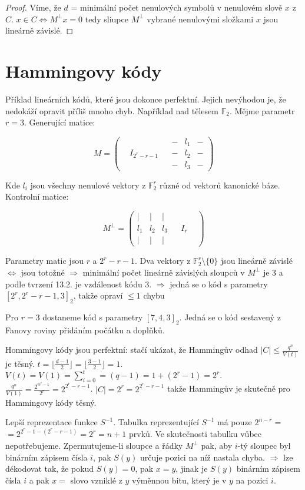 \begin{proof}
	Víme, že $d$ = minimální počet nenulových symbolů v nenulovém slově $x$ z $C$. $x \in C \Leftrightarrow M^{\bot}x = 0$ tedy sliupce $M^{\bot}$ vybrané nenulovými složkami $x$ jsou lineárně závislé.
\end{proof}

\section{Hammingovy kódy}

Příklad lineárních kódů, které jsou dokonce perfektní. Jejich nevýhodou je, že nedokáží opravit příliš mnoho chyb. Například nad tělesem $\mathbb{F}_{2}$. Mějme parametr $r = 3$. Generující matice:

$$
M =
\begin{pmatrix}
	&  &  & - & l_{1} & - \\
	& I_{2^{r}-r-1} &  & - & l_{2} & - \\
	&  &  & - & l_{3} & -
\end{pmatrix}
$$

Kde $l_{i}$ jsou všechny nenulové vektory z $\mathbb{F}_{2}^{r}$ různé od vektorů kanonické báze. Kontrolní matice:

$$
M^{\bot} =
\begin{pmatrix}
	| & | & | &  &  &  \\
	l_{1} & l_{2} & l_{3} &  & I_{r} &  \\
	| & | & | &  &  & 
\end{pmatrix}
$$

Parametry matic jsou $r$ a $2^{r}-r-1$. Dva vektory z $\mathbb{F}_{2}^{r} \setminus \{0\}$ jsou lineárně závislé $\Leftrightarrow$ jsou totožné $\Rightarrow$ minimální počet lineárně závislých sloupců v $M^{\bot}$ je $3$ a podle tvrzení 13.2. je vzdálenost kódu $3$. $\Rightarrow$ jedná se o kód s parametry $[2^{r}, 2^{r}-r-1, 3]_{2}$, takže opraví $\leq 1$ chybu

\begin{prikl}
	Pro  $r=3$ dostaneme kód s parametry $[7,4,3]_{2}$. Jedná se o kód sestavený z Fanovy roviny přidáním počátku a doplňků.
\end{prikl}

Hommingovy kódy jsou perfektní: stačí ukázat, že Hammingův odhad $|C| \leq \frac{q^{n}}{V(t)}$ je těsný. $t = \lfloor \frac{d-1}{2} \rfloor = \lfloor \frac{3-1}{2} \rfloor = 1$. $V(t) = V(1) = \sum_{i=0}^{t} = (q-1) = 1 + (2^{r}-1) = 2^{r}$. $\frac{q^n}{V(1)} = \frac{2^{@^{r}-1}}{2^{r}} = 2^{2^{r}-r-1}$. $|C| = 2^{r} = 2^{2^{r}-r-1}$ takže Hammingův je skutečně pro Hammingovy kódy těsný.

Lepší reprezentace funkce $S^{-1}$. Tabulka reprezentující $S^{-1}$ má pouze $2^{n-r}=$\newline $= 2^{2^{r}-1-(2^{r}-r-1)} = 2^{r} = n + 1$ prvků. Ve skutečnosti tabulku vůbec nepotřebujeme. Zpermutujeme-li sloupce a řádky $M^{\bot}$ pak, aby $i$-tý sloupec byl binárním zápisem čísla $i$, pak $S(y)$ určuje pozici na níž nastala chyba. $\Rightarrow$ lze dékodovat tak, že pokud $S(y) = 0$, pak $x=y$, jinak je $S(y)$ binárním zápisem čísla $i$ a pak $x =$ slovo vzniklé z $y$ výměnnou bitu, který je v $y$ na pozici $i$.
